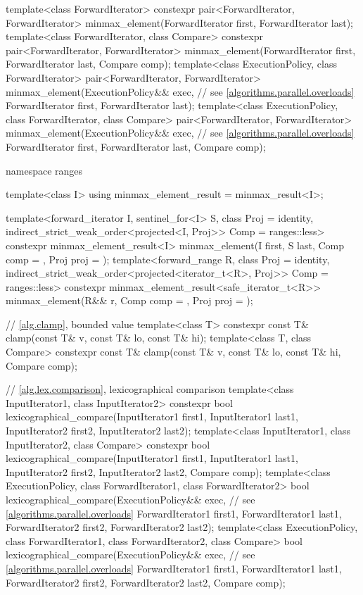 \begin{codeblock}
{  template<class ForwardIterator>
    constexpr pair<ForwardIterator, ForwardIterator>
      minmax_element(ForwardIterator first, ForwardIterator last);
  template<class ForwardIterator, class Compare>
    constexpr pair<ForwardIterator, ForwardIterator>
      minmax_element(ForwardIterator first, ForwardIterator last, Compare comp);
  template<class ExecutionPolicy, class ForwardIterator>
    pair<ForwardIterator, ForwardIterator>
      minmax_element(ExecutionPolicy&& exec,                    // see \ref{algorithms.parallel.overloads}
                     ForwardIterator first, ForwardIterator last);
  template<class ExecutionPolicy, class ForwardIterator, class Compare>
    pair<ForwardIterator, ForwardIterator>
      minmax_element(ExecutionPolicy&& exec,                    // see \ref{algorithms.parallel.overloads}
                     ForwardIterator first, ForwardIterator last, Compare comp);

  namespace ranges {
    template<class I>
    using minmax_element_result = minmax_result<I>;

    template<forward_iterator I, sentinel_for<I> S, class Proj = identity,
             indirect_strict_weak_order<projected<I, Proj>> Comp = ranges::less>
      constexpr minmax_element_result<I>
        minmax_element(I first, S last, Comp comp = {}, Proj proj = {});
    template<forward_range R, class Proj = identity,
             indirect_strict_weak_order<projected<iterator_t<R>, Proj>> Comp = ranges::less>
      constexpr minmax_element_result<safe_iterator_t<R>>
        minmax_element(R&& r, Comp comp = {}, Proj proj = {});
  }

  // \ref{alg.clamp}, bounded value
  template<class T>
    constexpr const T& clamp(const T& v, const T& lo, const T& hi);
  template<class T, class Compare>
    constexpr const T& clamp(const T& v, const T& lo, const T& hi, Compare comp);

  // \ref{alg.lex.comparison}, lexicographical comparison
  template<class InputIterator1, class InputIterator2>
    constexpr bool
      lexicographical_compare(InputIterator1 first1, InputIterator1 last1,
                              InputIterator2 first2, InputIterator2 last2);
  template<class InputIterator1, class InputIterator2, class Compare>
    constexpr bool
      lexicographical_compare(InputIterator1 first1, InputIterator1 last1,
                              InputIterator2 first2, InputIterator2 last2,
                              Compare comp);
  template<class ExecutionPolicy, class ForwardIterator1, class ForwardIterator2>
    bool
      lexicographical_compare(ExecutionPolicy&& exec,           // see \ref{algorithms.parallel.overloads}
                              ForwardIterator1 first1, ForwardIterator1 last1,
                              ForwardIterator2 first2, ForwardIterator2 last2);
  template<class ExecutionPolicy, class ForwardIterator1, class ForwardIterator2,
           class Compare>
    bool
      lexicographical_compare(ExecutionPolicy&& exec,           // see \ref{algorithms.parallel.overloads}
                              ForwardIterator1 first1, ForwardIterator1 last1,
                              ForwardIterator2 first2, ForwardIterator2 last2,
                              Compare comp);

}
\end{codeblock}
